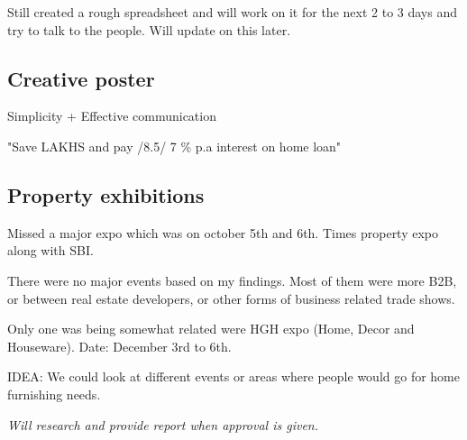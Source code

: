 \documentclass[12pt, a4paper]{article}
\begin{document}
\noindent Still created a rough spreadsheet and will work on it for the next 2 to 3 days and try to talk to the people. Will update on this later.

\subsection{Creative poster}

Simplicity + Effective communication

\vspace{0.3cm}

"Save LAKHS and pay /8.5/ 7 \% p.a interest on home loan"

\subsection{Property exhibitions}

Missed a major expo which was on october 5th and 6th. Times property expo along with SBI.

\noindent There were no major events based on my findings. Most of them were more B2B, or between real estate developers, or other forms of business related trade shows.

\noindent Only one was being somewhat related were HGH expo (Home, Decor and Houseware). Date: December 3rd to 6th.

\vspace{0.5cm}

\noindent IDEA: We could look at different events or areas where people would go for home furnishing needs.

\vspace{0.25cm}


\textit{Will research and provide report when approval is given.}
\end{document}
